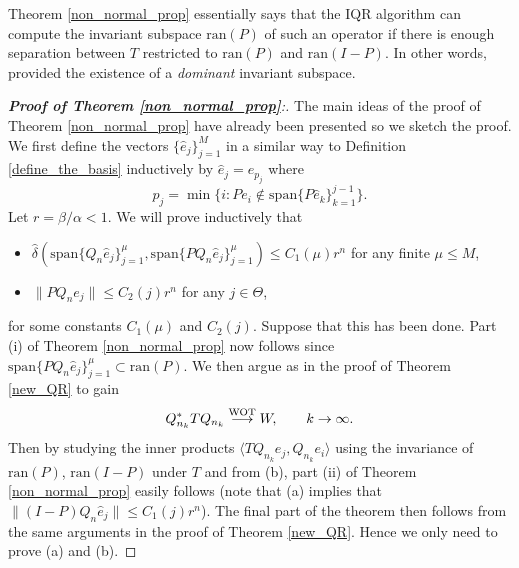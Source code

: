 \documentclass[a4paper,10pt]{article}
\begin{document}
\begin{remark}
Theorem \ref{non_normal_prop} essentially says that the IQR algorithm can compute the invariant subspace $\mathrm{ran}(P)$ of such an operator if there is enough separation between $T$ restricted to $\mathrm{ran}(P)$ and $\mathrm{ran}(I-P)$. In other words, provided the existence of a \textit{dominant} invariant subspace.
\end{remark}

\begin{proof}[\textbf{Proof of Theorem \ref{non_normal_prop}}:]
The main ideas of the proof of Theorem \ref{non_normal_prop} have already been presented so we sketch the proof. We first define the vectors $\{\hat e_j\}_{j=1}^M$ in a similar way to Definition \ref{define_the_basis} inductively by $\hat e_j=e_{p_j}$ where
$$
p_j=\min\{i:Pe_i\notin\mathrm{span}\{P\hat e_{k}\}_{k=1}^{j-1}\}.
$$
Let $r=\beta/\alpha<1$. We will prove inductively that
\begin{itemize}
	\item[(a)] $\hat\delta(\mathrm{span}\{Q_n\hat e_j\}_{j=1}^\mu,\mathrm{span}\{PQ_n\hat e_j\}_{j=1}^\mu)\leq C_1(\mu)r^n$ for any finite $\mu\leq M$,
	\item[(b)] $\|PQ_ne_j\|\leq C_2(j)r^n$ for any $j\in\Theta$,
\end{itemize}
for some constants $C_1(\mu)$ and $C_2(j)$. Suppose that this has been done. Part (i) of Theorem \ref{non_normal_prop} now follows since $\mathrm{span}\{PQ_n\hat e_j\}_{j=1}^\mu\subset\mathrm{ran}(P)$. We then argue as in the proof of Theorem \ref{new_QR} to gain
$$
 Q_{n_k}^*TQ_{n_k} \stackrel{\text{\scriptsize WOT}}{\longrightarrow} W, \qquad k
\rightarrow \infty.
$$
Then by studying the inner products $\langle TQ_{n_k}e_j,Q_{n_k}e_i\rangle$ using the invariance of $\mathrm{ran}(P)$, $\mathrm{ran}(I-P)$ under $T$ and from (b), part (ii) of Theorem \ref{non_normal_prop} easily follows (note that (a) implies that $\|(I-P)Q_n\hat e_j\|\leq C_1(j)r^n$). The final part of the theorem then follows from the same arguments in the proof of Theorem \ref{new_QR}. Hence we only need to prove (a) and (b).


\end{proof}
\end{document}

